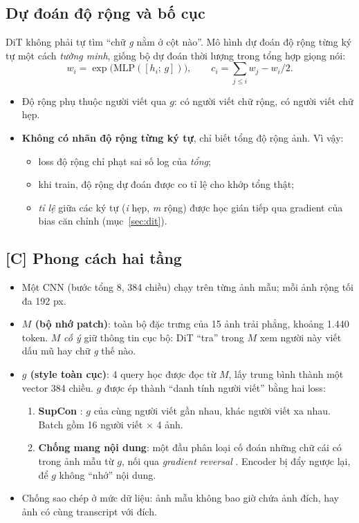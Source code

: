 \documentclass[11pt,a4paper]{article}
\begin{document}
\subsection{Dự đoán độ rộng và bố cục}
DiT không phải tự tìm ``chữ \emph{g} nằm ở cột nào''. Mô hình dự đoán độ rộng từng ký tự một cách \emph{tường minh}, giống bộ dự đoán thời lượng trong tổng hợp giọng nói:
\begin{equation}
w_i = \exp\big(\mathrm{MLP}([h_i;\,g])\big),\qquad c_i = \textstyle\sum_{j\le i} w_j - w_i/2 .
\end{equation}
\begin{itemize}
\item Độ rộng phụ thuộc người viết qua $g$: có người viết chữ rộng, có người viết chữ hẹp.
\item \textbf{Không có nhãn độ rộng từng ký tự}, chỉ biết tổng độ rộng ảnh. Vì vậy:
  \begin{itemize}
  \item loss độ rộng chỉ phạt sai số log của \emph{tổng};
  \item khi train, độ rộng dự đoán được co tỉ lệ cho khớp tổng thật;
  \item \emph{tỉ lệ} giữa các ký tự (\emph{i} hẹp, \emph{m} rộng) được học gián tiếp qua gradient của bias căn chỉnh (mục~\ref{sec:dit}).
  \end{itemize}
\end{itemize}

\subsection{[C] Phong cách hai tầng}
\begin{itemize}
\item Một CNN (bước tổng 8, 384 chiều) chạy trên từng ảnh mẫu; mỗi ảnh rộng tối đa 192 px.
\item \textbf{$M$ (bộ nhớ patch)}: toàn bộ đặc trưng của 15 ảnh trải phẳng, khoảng 1.440 token. $M$ \emph{cố ý} giữ thông tin cục bộ: DiT ``tra'' trong $M$ xem người này viết dấu mũ hay chữ \emph{g} thế nào.
\item \textbf{$g$ (style toàn cục)}: 4 query học được đọc từ $M$, lấy trung bình thành một vector 384 chiều. $g$ được ép thành ``danh tính người viết'' bằng hai loss:
  \begin{enumerate}
  \item \textbf{SupCon} \cite{khosla2020}: $g$ của cùng người viết gần nhau, khác người viết xa nhau. Batch gồm 16 người viết × 4 ảnh.
  \item \textbf{Chống mang nội dung}: một đầu phân loại cố đoán những chữ cái có trong ảnh mẫu từ $g$, nối qua \emph{gradient reversal} \cite{ganin2015}. Encoder bị đẩy ngược lại, để $g$ không ``nhớ'' nội dung.
  \end{enumerate}
\item Chống sao chép ở mức dữ liệu: ảnh mẫu không bao giờ chứa ảnh đích, hay ảnh có cùng transcript với đích.
\end{itemize}
\end{document}
